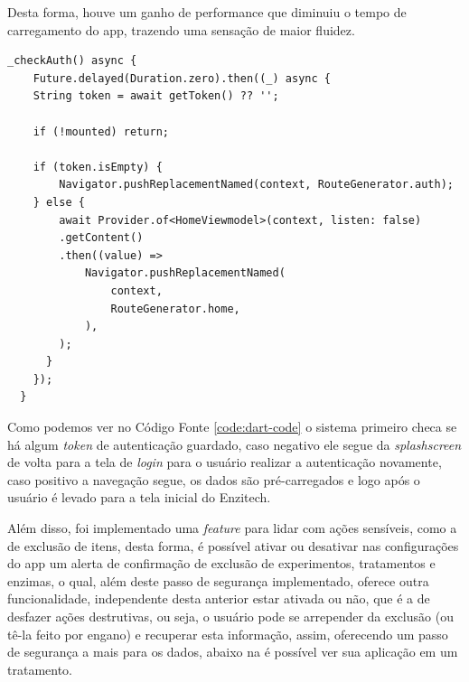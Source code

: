 Desta forma, houve um ganho de performance que diminuiu o tempo de carregamento do \ac{app}, trazendo uma sensação de maior fluidez.
\hfill \break
\begin{code}
\label{code:dart-code}
\begin{verbatim}
_checkAuth() async {
    Future.delayed(Duration.zero).then((_) async {
    String token = await getToken() ?? '';

    if (!mounted) return;

    if (token.isEmpty) {
        Navigator.pushReplacementNamed(context, RouteGenerator.auth);
    } else {
        await Provider.of<HomeViewmodel>(context, listen: false)
        .getContent()
        .then((value) =>
            Navigator.pushReplacementNamed(
                context, 
                RouteGenerator.home,
            ),
        );
      }
    });
  }
\end{verbatim}
\end{code}

Como podemos ver no Código Fonte \ref{code:dart-code} o sistema primeiro checa se há algum \textit{token} de autenticação guardado, caso negativo ele segue da \textit{splashscreen} de volta para a tela de \textit{login} para o usuário realizar a autenticação novamente, caso positivo a navegação segue, os dados são pré-carregados e logo após o usuário é levado para a tela inicial do Enzitech.

Além disso, foi implementado uma \textit{feature} para lidar com ações sensíveis, como a de exclusão de itens, desta forma, é possível ativar ou desativar nas configurações do \ac{app} um alerta de confirmação de exclusão de experimentos, tratamentos e enzimas, o qual, além deste passo de segurança implementado, oferece outra funcionalidade, independente desta anterior estar ativada ou não, que é a de desfazer ações destrutivas, ou seja, o usuário pode se arrepender da exclusão (ou tê-la feito por engano) e recuperar esta informação, assim, oferecendo um passo de segurança a mais para os dados, abaixo na  é possível ver sua aplicação em um tratamento.

